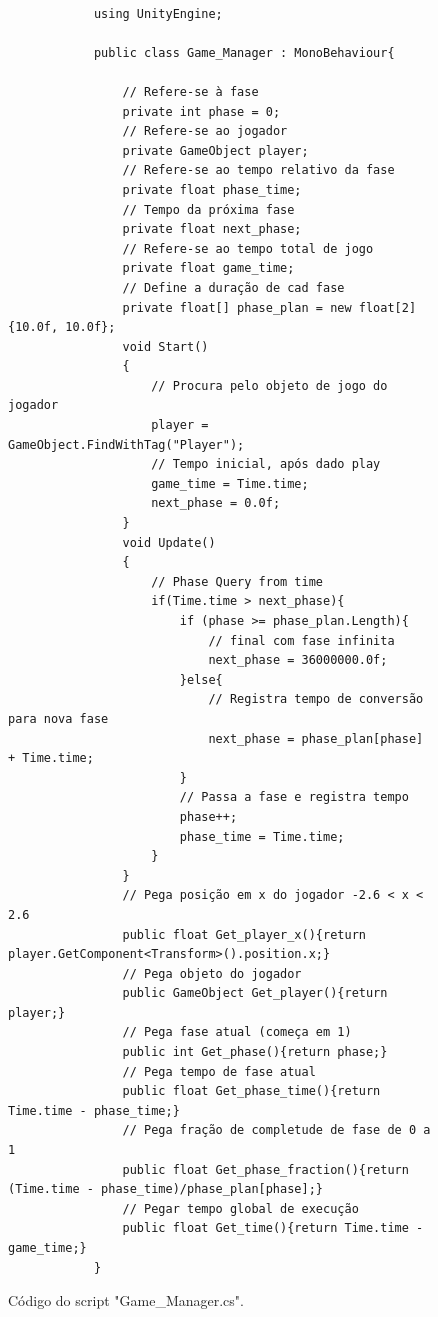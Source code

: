 \begin{figure}[ht!]
        \centering
        \begin{lstlisting}

            using UnityEngine;

            public class Game_Manager : MonoBehaviour{

                // Refere-se à fase
                private int phase = 0;
                // Refere-se ao jogador
                private GameObject player;
                // Refere-se ao tempo relativo da fase
                private float phase_time;
                // Tempo da próxima fase
                private float next_phase;
                // Refere-se ao tempo total de jogo
                private float game_time;
                // Define a duração de cad fase
                private float[] phase_plan = new float[2]{10.0f, 10.0f};
                void Start()
                {
                    // Procura pelo objeto de jogo do jogador
                    player = GameObject.FindWithTag("Player");
                    // Tempo inicial, após dado play
                    game_time = Time.time;
                    next_phase = 0.0f;
                }
                void Update()
                {
                    // Phase Query from time
                    if(Time.time > next_phase){
                        if (phase >= phase_plan.Length){
                            // final com fase infinita
                            next_phase = 36000000.0f;
                        }else{
                            // Registra tempo de conversão para nova fase
                            next_phase = phase_plan[phase] + Time.time;
                        }
                        // Passa a fase e registra tempo
                        phase++;
                        phase_time = Time.time;
                    }
                }
                // Pega posição em x do jogador -2.6 < x < 2.6
                public float Get_player_x(){return player.GetComponent<Transform>().position.x;}
                // Pega objeto do jogador
                public GameObject Get_player(){return player;}
                // Pega fase atual (começa em 1)
                public int Get_phase(){return phase;}
                // Pega tempo de fase atual
                public float Get_phase_time(){return Time.time - phase_time;}
                // Pega fração de completude de fase de 0 a 1
                public float Get_phase_fraction(){return (Time.time - phase_time)/phase_plan[phase];}
                // Pegar tempo global de execução
                public float Get_time(){return Time.time - game_time;}
            }
        \end{lstlisting}
        \caption{Código do script "Game\_Manager.cs".}
        \label{code:gamemanager}

    \end{figure}









